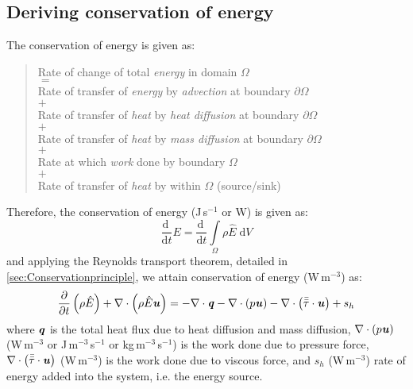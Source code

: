 \subsection{Deriving conservation of energy}

The conservation of energy is given as:
 \begin{quote}
	\centering
	Rate of change of total \textit{energy} in domain $\Omega$\\
	$=$\\
	Rate of transfer of \textit{energy} by \textit{advection} at boundary $\partial \Omega$\\
	$+$\\		
	Rate of transfer of \textit{heat} by \textit{heat diffusion} at boundary $\partial \Omega$\\
	$+$\\
	Rate of transfer of \textit{heat} by \textit{mass diffusion} at boundary $\partial \Omega$\\
	$+$\\
	Rate at which \textit{work} done by boundary $\Omega$\\	
	$+$\\	
	Rate of transfer of \textit{heat} by within $\Omega$ (source/sink)
\end{quote}

Therefore, the conservation of energy (J\,s$^{-1}$ or W) is given as:
\begin{equation}
\frac{\mathrm{d}~}{{\mathrm{d}t}}E = \frac{\mathrm{d}~}{{\mathrm{d}t}} \int \limits_\Omega  \rho \hat{E}\;\mathrm{d}V
\end{equation}
and applying the Reynolds transport theorem, detailed in \cref{sec:Conservationprinciple}, we attain conservation of energy (W\,m$^{-3}$) as:
\begin{equation}
\frac{\partial }{{\partial t}}\left( {{\rho }{\hat{E}}} \right) + \nabla  \cdot \left( {{\rho }{\hat{E}}{\textbf{\textit{u}}}} \right) =  - \nabla  \cdot {\textbf{\textit{q}}} - \nabla  \cdot \left( {{p}{\textbf{\textit{u}}}} \right) - \nabla  \cdot \left(  \bar{\bar{{\tau}}} \cdot \textbf{\textit{u}} \right) + s_h
\label{eq:energy1}
\end{equation}
where $\textbf{\textit{q}}$ is the total heat flux due to heat diffusion and mass diffusion, $\nabla \cdot \left(p\textbf{\textit{u}}\right)$ (W\,m$^{-3}$ or J\,m$^{-3}$\,s$^{-1}$ or kg\,m$^{-3}$\,s$^{-1}$) is the work done due to pressure force, $\nabla  \cdot \left(  \bar{\bar{{\tau}}} \cdot \textbf{\textit{u}} \right)$ (W\,m$^{-3}$) is the work done due to viscous force, and $s_h$ (W\,m$^{-3}$) rate of energy added into the system, i.e. the energy source. 

